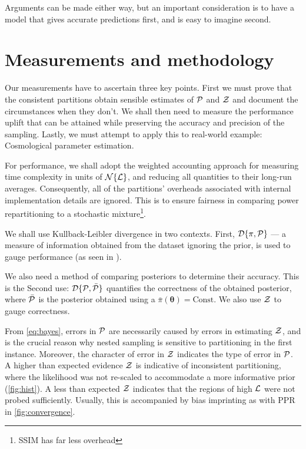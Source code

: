 \documentclass[usenatbib]{mnras}
\begin{document}
Arguments can be made either way, but an important consideration is to
have a model that gives accurate predictions first, and is easy to
imagine second.

\section{Measurements and methodology}
Our measurements have to ascertain three key points. First we must
prove that the consistent partitions obtain sensible estimates of
${\cal P}$ and ${\cal Z}$ and document the circumstances when they
don't. We shall then need to measure the performance uplift that can
be attained while preserving the accuracy and precision of the
sampling. Lastly, we must attempt to apply this to real-world example:
Cosmological parameter estimation. 

For performance, we shall adopt the weighted accounting approach
\citep{Cormen} for measuring time complexity in units of
\({\cal N}\{{\cal L}\}\), and reducing all quantities to their
long-run averages. Consequently, all of the partitions' overheads
associated with internal implementation details are ignored. This is
to ensure fairness in comparing power repartitioning to a stochastic
mixture\footnote{SSIM has far less overhead}.

We shall use Kullback-Leibler divergence in two contexts. First,
${\cal D}\{\pi, {\cal P}\}$ --- a measure of information obtained from
the dataset ignoring the prior, is used to gauge performance (as seen
in ).

We also need a method of comparing posteriors to determine their
accuracy. This is the Second use:
${\cal D}\{ {\cal P}, \bar{\cal P} \}$ quantifies the correctness of
the obtained posterior, where $\bar{\cal P}$ is the posterior obtained
using a $\bar{\pi}(\bm{\theta}) = \text{Const}$. We also use
${\cal Z}$ to gauge correctness.

From \cref{eq:bayes}, errors in ${\cal P}$ are necessarily caused by
errors in estimating ${\cal Z}$, and is the crucial reason why nested
sampling is sensitive to partitioning in the first instance. Moreover,
the character of error in ${\cal Z}$ indicates the type of error in
${\cal P}$. A higher than expected evidence ${\cal Z}$ is indicative
of inconsistent partitioning, where the likelihood was not re-scaled
to accommodate a more informative prior (\cref{fig:hist}). A less than
expected ${\cal Z}$ indicates that the regions of high ${\cal L}$ were
not probed sufficiently. Usually, this is accompanied by bias
imprinting as with PPR in \cref{fig:convergence}.
\end{document}
